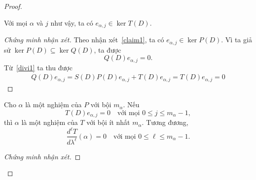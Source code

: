 ﻿\documentclass[12pt]{article}
\begin{document}
\begin{proof}
\begin{claim}
Với mọi $\alpha$ và $j$ như vậy, ta có $e_{\alpha, j} \in \ker T(D)$.
\end{claim} 
\begin{proof}[Chứng minh nhận xét]
Theo nhận xét~\ref{claim1}, ta có $e_{\alpha, j} \in \ker P(D)$. Vì ta giả sử $\ker P(D) \subseteq \ker Q(D)$, ta được
\[
 Q(D)e_{\alpha, j} = 0.
\]
Từ~\eqref{divi1} ta thu được
\[
\begin{aligned}
 Q(D)e_{\alpha, j} = S(D)P(D)e_{\alpha, j} + T(D)e_{\alpha, j} = T(D)e_{\alpha, j} = 0
\end{aligned}
\]
\end{proof}
\begin{claim}\label{factorroot}
Cho $\alpha$ là một nghiệm của $P$ với bội $m_\alpha$.
Nếu
\begin{equation}\label{assump1}
 T(D)e_{\alpha, j} = 0
 \quad
 \text{với mọi }0\le j\le m_\alpha - 1,
\end{equation}
thì $\alpha$ là một nghiệm của $T$ với bội ít nhất $m_\alpha$. Tương đương,
\[
 \frac{d^\ell T}{d\lambda^\ell}(\alpha) = 0
 \quad
 \text{với mọi }0\le \ell\le m_\alpha - 1.
\]
\end{claim}
\begin{proof}[Chứng minh nhận xét]


\end{proof}
\end{proof}
\end{document}
